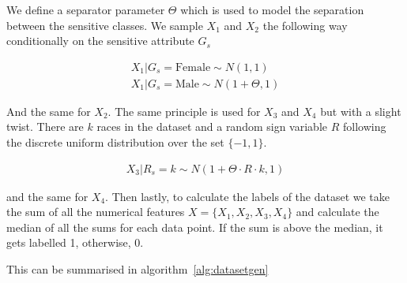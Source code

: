 We define a separator parameter $\Theta$ which is used to model the separation between the sensitive classes. We sample $X_1$ and $X_2$ the following way conditionally on the sensitive attribute $G_s$

\begin{equation*}
    \begin{aligned}
           X_1 | G_s = \text{Female} \sim N(1, 1) \\ 
           X_1 | G_s = \text{Male} \sim N(1 + \Theta, 1)
    \end{aligned}
\end{equation*}

And the same for $X_2$. The same principle is used for $X_3$ and $X_4$ but with a slight twist. There are $k$ races in the dataset and a random sign variable $R$ following the discrete uniform distribution over the set $\{-1, 1\}$.

\begin{equation*}
    \begin{aligned}
        X_3 | R_s = k \sim N(1 + \Theta \cdot R \cdot k, 1)
    \end{aligned}
\end{equation*}

and the same for $X_4$. Then lastly, to calculate the labels of the dataset we take the sum of all the numerical features $X = \{ X_1, X_2, X_3, X_4 \}$ and calculate the median of all the sums for each data point. If the sum is above the median, it gets labelled 1, otherwise, 0.

This can be summarised in algorithm~\ref{alg:datasetgen}

